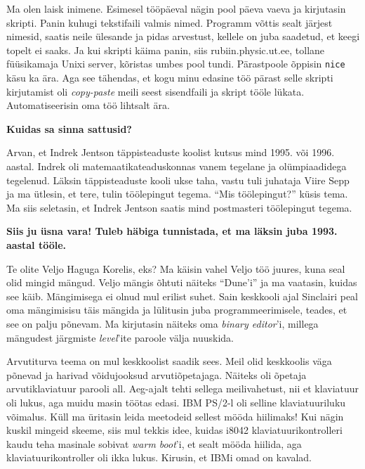 Ma olen laisk inimene. Esimesel tööpäeval nägin pool päeva vaeva ja
kirjutasin skripti. Panin kuhugi tekstifaili valmis nimed. Programm võttis
sealt järjest nimesid, saatis neile ülesande ja pidas arvestust, kellele
on juba saadetud, et keegi topelt ei saaks. Ja kui skripti käima
panin, siis rubiin.physic.ut.ee, tollane
füüsikamaja Unixi server, kõristas umbes pool tundi. Pärastpoole õppisin
\verb|nice| käsu ka ära. Aga see tähendas, et kogu minu edasine töö
pärast selle skripti kirjutamist oli \emph{copy-paste} meili seest sisendfaili
ja skript tööle lükata. Automatiseerisin oma töö lihtsalt ära.

\textbf{Kuidas sa sinna sattusid?}

Arvan, et Indrek Jentson täppisteaduste koolist
kutsus mind 1995. või 1996. aastal. Indrek oli matemaatikateaduskonnas vanem tegelane ja
olümpiaadidega tegelenud. Läksin täppisteaduste kooli ukse taha, vastu tuli juhataja Viire
Sepp ja ma ütlesin, et tere, tulin
töölepingut tegema. \enquote{Mis töölepingut?} küsis tema. Ma siis seletasin,
et Indrek Jentson saatis mind postmasteri töölepingut tegema.

\textbf{Siis ju üsna vara! Tuleb häbiga tunnistada, et ma läksin juba 1993.
aastal tööle.}

Te olite Veljo Haguga Korelis, eks? Ma
käisin vahel Veljo töö juures, kuna seal olid mingid mängud. Veljo mängis õhtuti näiteks
\enquote{Dune'i} ja ma vaatasin, kuidas see käib. Mängimisega ei olnud mul erilist
suhet. Sain keskkooli ajal Sinclairi peal oma mängimisisu täis mängida ja
lülitusin juba programmeerimisele, teades, et see on palju põnevam. Ma kirjutasin näiteks oma \emph{binary editor}'i, millega mängudest
järgmiste \emph{level}'ite paroole välja nuuskida.

Arvutiturva teema on mul keskkoolist saadik sees. Meil olid keskkoolis
väga põnevad ja harivad võidujooksud arvutiõpetajaga. Näiteks oli õpetaja
arvutiklaviatuur parooli all. Aeg-ajalt tehti sellega meilivahetust, nii et
klaviatuur oli lukus, aga muidu masin töötas edasi. IBM
PS/2-l oli selline klaviatuuriluku võimalus. Küll ma üritasin
leida meetodeid sellest mööda hiilimaks! Kui nägin kuskil mingeid skeeme, siis mul tekkis idee, kuidas i8042 klaviatuurikontrolleri kaudu teha
masinale sobivat \emph{warm boot}'i, et sealt mööda hiilida, aga
klaviatuurikontroller oli ikka lukus. Kirusin, et IBMi omad on kavalad.

